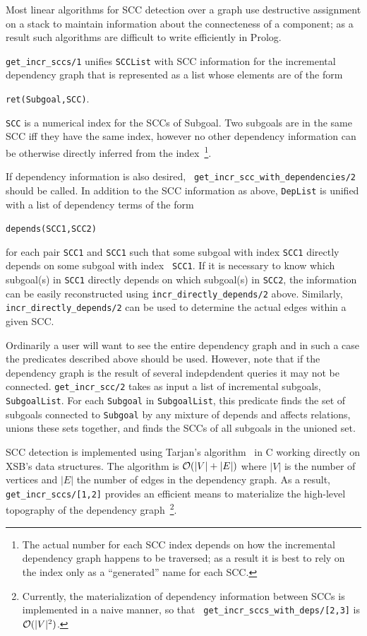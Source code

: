 \begin{description}
\begin{itemize}
Most linear algorithms for SCC detection over a graph use destructive
assignment on a stack to maintain information about the connecteness
of a component; as a result such algorithms are
difficult to write efficiently in Prolog.

{\tt get\_incr\_sccs/1} unifies {\tt SCCList} with SCC information for
the incremental dependency graph that is represented as a list whose
elements are of the form
\begin{center}
{\tt ret(Subgoal,SCC)}.
\end{center}
{\tt SCC} is a numerical index for the SCCs of Subgoal. Two subgoals
are in the same SCC iff they have the same index, however no other
dependency information can be otherwise directly inferred from the
index~\footnote{The actual number for each SCC index depends on how
  the incremental dependency graph happens to be traversed; as a
  result it is best to rely on the index only as a ``generated'' name
  for each SCC.}.

If dependency information is also desired, {\tt
  get\_incr\_scc\_with\_dependencies/2} should be called.  In addition
to the SCC information as above, {\tt DepList} is unified with a list
of dependency terms of the form
\begin{center}
{\tt depends(SCC1,SCC2)}
\end{center}
for each pair {\tt SCC1} and {\tt SCC1} such that some subgoal with
index {\tt SCC1} directly depends on some subgoal with index {\tt
  SCC1}.  If it is necessary to know which subgoal(s) in {\tt SCC1}
directly depends on which subgoal(s) in {\tt SCC2}, the information
can be easily reconstructed using {\tt incr\_directly\_depends/2}
above.  Similarly, {\tt incr\_directly\_depends/2} can be used to
determine the actual edges within a given SCC.

Ordinarily a user will want to see the entire dependency graph and in
such a case the predicates described above should be used.  However,
note that if the dependency graph is the result of several
indepdendent queries it may not be connected.  {\tt get\_incr\_scc/2}
takes as input a list of incremental subgoals, {\tt SubgoalList}.  For
each {\tt Subgoal} in {\tt SubgoalList}, this predicate finds the set
of subgoals connected to {\tt Subgoal} by any mixture of depends and
affects relations, unions these sets together, and finds the SCCs of
all subgoals in the unioned set.

SCC detection is implemented using Tarjan's algorithm~\cite{Tarj72} in
C working directly on XSB's data structures.  The algorithm is
${\cal O}(|V| + |E|)$ where $|V|$ is the number of vertices and $|E|$ the
number of edges in the dependency graph.  As a result, {\tt
  get\_incr\_sccs/[1,2]} provides an efficient means to materialize the
  high-level topography of the dependency graph~\footnote{Currently,
    the materialization of dependency information between SCCs is
    implemented in a naive manner, so that {\tt
      get\_incr\_sccs\_with\_deps/[2,3]} is ${\cal O}(|V|^2)$.}.


\end{itemize}
\end{description}
